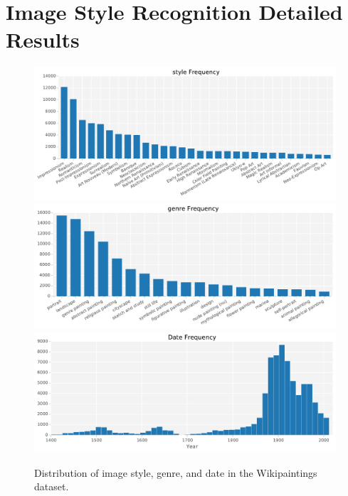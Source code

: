 \chapter{Image Style Recognition Detailed Results}\label{sec:style_appendix}

\begin{figure}[th]
\centering
\includegraphics[width=\linewidth]{../style/figures/wikipaintings_style.pdf}\\
\includegraphics[width=\linewidth]{../style/figures/wikipaintings_genre.pdf}\\
\includegraphics[width=\linewidth]{../style/figures/wikipaintings_date.pdf}
\caption{Distribution of image style, genre, and date in the Wikipaintings dataset.}
\label{fig:wikipaintings_data}
\end{figure}

